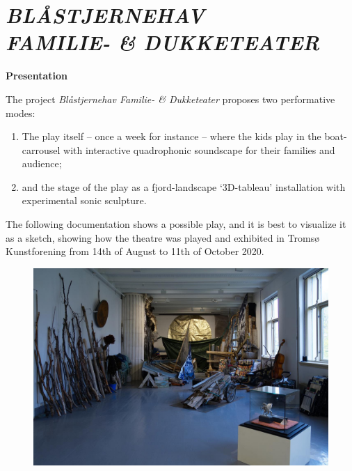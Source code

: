 \chapter*{ \textsl{\textbf{BL\AA STJERNEHAV  \\ FAMILIE- \& DUKKETEATER}}}

\label{psh}

\vspace{1cm}

{\Large \textbf{Presentation}}

\bigskip
\bigskip

The project \textsl{Bl\aa stjernehav Familie- \& Dukketeater} proposes two performative modes: 
\begin{enumerate}
\item The play itself -- once a week for instance -- where the kids play in the boat-carrousel with interactive quadrophonic soundscape for their families and audience;
\item and the stage of the play as a fjord-landscape `3D-tableau' installation with experimental sonic sculpture.
\end{enumerate}

\bigskip

The following documentation shows a possible play, and it is best to visualize it as a sketch, showing how the theatre was played and exhibited in Troms\o{} Kunstforening from 14th of August to 11th of October 2020. 

\bigskip

\begin{figure}[h]
		\includegraphics[width=\textwidth]{mp/img/img1}
		\label{sh}
\end{figure}


